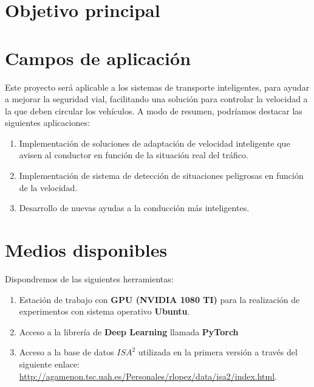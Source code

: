 \section{Objetivo principal}



\section{Campos de aplicación}


Este proyecto será aplicable a los sistemas de transporte inteligentes, para ayudar a mejorar la seguridad vial, facilitando una solución para controlar la velocidad a la que deben circular los vehículos. A modo de resumen, podríamos destacar las siguientes aplicaciones:
\begin{enumerate}	
	\item Implementación de soluciones de adaptación de velocidad inteligente que avisen al conductor en función de la situación real del tráfico.
	\item Implementación de sistema de detección de situaciones peligrosas en función de la velocidad.
	\item Desarrollo de nuevas ayudas a la conducción más inteligentes.
\end{enumerate}

\section{Medios disponibles}

Dispondremos de las siguientes herramientas:

\begin{enumerate}
	\item Estación de trabajo con \textbf{GPU (NVIDIA 1080 TI)} para la realización de experimentos con sistema operativo \textbf{Ubuntu}.
	\item Acceso a la librería de \textbf{Deep Learning} llamada \textbf{PyTorch} \cite{pytorch}
	\item Acceso a la base de datos $ISA^2$ utilizada en la primera versión \cite{isa2} a través del siguiente enlace: \url{http://agamenon.tsc.uah.es/Personales/rlopez/data/isa2/index.html}.
\end{enumerate}

